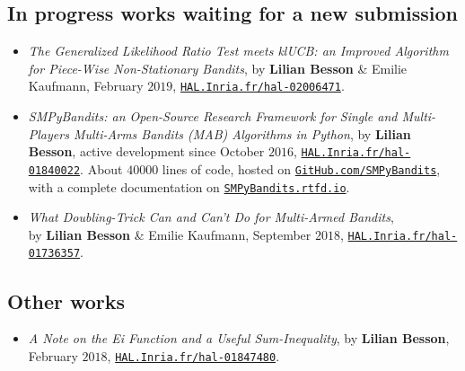 \subsection{In progress works waiting for a new submission}

\begin{itemize}

\item
    \emph{The Generalized Likelihood Ratio Test meets klUCB: an Improved Algorithm for Piece-Wise Non-Stationary Bandits},
    by \textbf{Lilian Besson} \& Emilie Kaufmann, February $2019$,
    \href{https://HAL.Inria.fr/hal-02006471}{\texttt{HAL.Inria.fr/hal-02006471}}.
    \cite{Besson2019GLRT}

\item
    \emph{SMPyBandits: an Open-Source Research Framework for Single and Multi-Players Multi-Arms Bandits (MAB) Algorithms in Python},
    by \textbf{Lilian Besson}, active development since October $2016$,
    \href{https://HAL.Inria.fr/hal-01840022}{\texttt{HAL.Inria.fr/hal-01840022}}.
    About $40000$ lines of code, hosted on \href{https://GitHub.com/SMPyBandits}{\texttt{GitHub.com/SMPyBandits}},
    with a complete documentation on \href{https://SMPyBandits.rtfd.io}{\texttt{SMPyBandits.rtfd.io}}.
    \cite{SMPyBandits,SMPyBanditsJMLR}

\item
    \emph{What Doubling-Trick Can and Can't Do for Multi-Armed Bandits},\\
    by \textbf{Lilian Besson} \& Emilie Kaufmann, September $2018$,
    \href{https://HAL.Inria.fr/hal-01736357}{\texttt{HAL.Inria.fr/hal-01736357}}.
    \cite{Besson2018DoublingTricks}

\end{itemize}


\subsection{Other works}

\begin{itemize}
\item
    \emph{A Note on the Ei Function and a Useful Sum-Inequality},
    by \textbf{Lilian Besson},
    February $2018$,
    \href{https://HAL.Inria.fr/hal-01847480}{\texttt{HAL.Inria.fr/hal-01847480}}.

\end{itemize}


